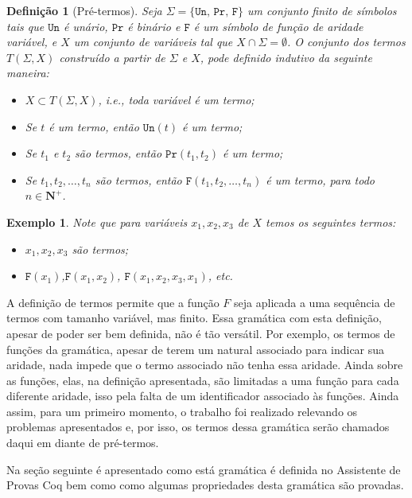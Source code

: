 \documentclass{article}
\newtheorem{definicao}{Definição}
\newtheorem{exemplo}{Exemplo}
\begin{document}
\begin{definicao}[Pré-termos]
	Seja $\Sigma=\{\texttt{Un, Pr, F}\}$ um conjunto finito de símbolos tais que $\texttt{Un}$ é
	unário, $\texttt{Pr}$ é binário e $\texttt{F}$ é um símbolo de função de aridade variável, e $X$ um
	conjunto de variáveis tal que $X \cap \Sigma = \emptyset$.
	O conjunto dos termos $T(\Sigma, X)$ construído a partir de $\Sigma$ e $X$, pode definido indutivo
	da seguinte maneira:
	\begin{itemize}
		\item $X \subset T(\Sigma, X)$, i.e., toda variável é um termo;
		\item Se $t$ é um termo, então $\texttt{Un}(t)$ é um termo;
		\item Se $t_1$ e $t_2$ são  termos, então $\texttt{Pr}(t_1, t_2)$ é um termo;
	 	\item Se $t_1, t_2, \ldots, t_n$ são  termos, então $\texttt{F}(t_1,t_2,\ldots, t_n)$ é um
			 termo, para todo $n \in \mathbf{N}^+$.
	\end{itemize}
	\label{definicao:pre-termos}
\end{definicao}

\begin{exemplo}
	Note que para variáveis $x_1,x_2,x_3$ de $X$ temos os seguintes termos:
	\begin{itemize}
		\item $x_1, x_2, x_3$ são termos;
		\item $\texttt{F}(x_1)$,$\texttt{F}(x_1, x_2)$, $\texttt{F}(x_1, x_2, x_3, x_1)$, etc.
	\end{itemize}
	\label{exemplo:pre-termos}
\end{exemplo}

A definição de termos permite que a função $F$ seja aplicada a uma sequência de termos com tamanho
variável, mas finito.
Essa gramática com esta definição, apesar de poder ser bem definida, não é tão versátil. Por exemplo,
os termos de funções da gramática, apesar de terem um natural associado para indicar sua aridade, nada
impede que o termo associado não tenha essa aridade. Ainda sobre as funções, elas, na definição
apresentada, são limitadas a uma função para cada diferente aridade, isso pela falta de um
identificador associado às funções. Ainda assim, para um primeiro momento, o trabalho foi realizado
relevando os problemas apresentados e, por isso, os termos dessa gramática serão chamados daqui em
diante de pré-termos.

Na seção seguinte é apresentado como está gramática é definida no Assistente de Provas Coq bem como como
algumas propriedades desta gramática são provadas.
\end{document}
